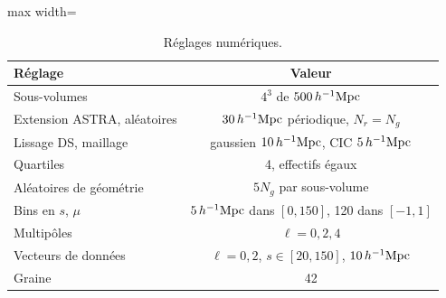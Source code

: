 \begin{table}[!htbp]
\centering\small
\begin{adjustbox}{max width=\linewidth}
\begin{tabular}{lc}
\toprule
Réglage & Valeur \\
\midrule
Sous-volumes & $4^3$ de $500\,h^{-1}\mathrm{Mpc}$ \\
Extension ASTRA, aléatoires & $30\,h^{-1}\mathrm{Mpc}$ périodique, $N_r=N_g$ \\
Lissage DS, maillage & gaussien $10\,h^{-1}\mathrm{Mpc}$, CIC $5\,h^{-1}\mathrm{Mpc}$ \\
Quartiles & 4, effectifs égaux \\
Aléatoires de géométrie & $5N_g$ par sous-volume \\
Bins en $s$, $\mu$ & $5\,h^{-1}\mathrm{Mpc}$ dans $[0,150]$, 120 dans $[-1,1]$ \\
Multipôles & $\ell=0,2,4$ \\
Vecteurs de données & $\ell=0,2$, $s\in[20,150]$, $10\,h^{-1}\mathrm{Mpc}$ \\
Graine & 42 \\
\bottomrule
\end{tabular}
\end{adjustbox}
\caption{Réglages numériques.}
\label{tab:config}
\end{table}


